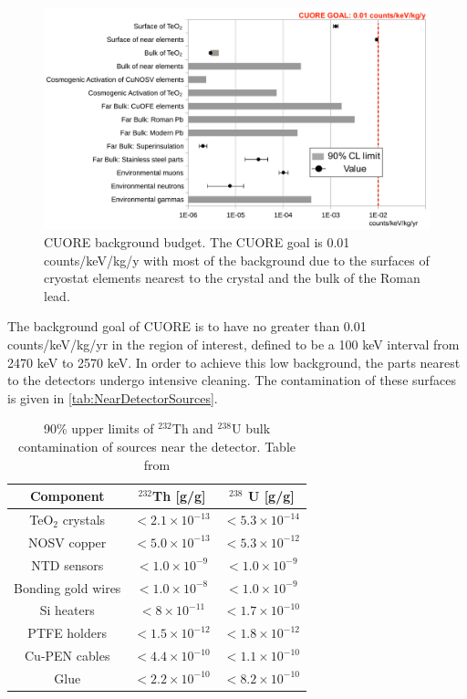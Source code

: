 \begin{figure}[htbp]
\centering
\includegraphics[width=0.7\linewidth]{Figures/CUORE_background_budget}
\caption{CUORE background budget. The CUORE goal is 0.01 counts/keV/kg/y with most of the background due to the surfaces of cryostat elements nearest to the crystal and the bulk of the Roman lead.}
\label{fig:istogramma}
\end{figure}

The background goal of CUORE is to have no greater than 0.01 counts/keV/kg/yr in the region of interest, defined to be a 100 keV interval from 2470 keV to 2570 keV. In order to achieve this low background, the parts nearest to the detectors undergo intensive cleaning. The contamination of these surfaces is given in \autoref*{tab:NearDetectorSources}.

\begin{table}[htbp]
\centering
\caption[90\% upper limits of $^{232}$Th and $^{238}$U bulk contamination of sources near the detector.]{90\% upper limits of $^{232}$Th and $^{238}$U bulk contamination of sources near the detector. Table from \cite{Alduino:2016vjd}}
\label{tab:NearDetectorSources}
\begin{tabular}{|c|c|c|}
\hline 
 Component & $^{232}$Th [g/g] & $^{238}$ U [g/g] \\ 
\hline 
TeO$_2$ crystals & $< 2.1\times 10^{-13}$ & $<5.3\times 10^{-14}$ \\ 
\hline 
NOSV copper & $<5.0 \times 10^{-13}$ & $<5.3 \times 10^{-12}$ \\ 
\hline 
NTD sensors & $< 1.0 \times 10^{-9}$ & $<1.0 \times 10^{-9}$ \\ 
\hline 
Bonding gold wires & $< 1.0 \times 10^{-8}$ & $<1.0 \times 10^{-9}$ \\ 
\hline 
Si heaters &   $<8\times 10^{-11}$ & $<1.7 \times 10^{-10}$ \\ 
\hline 
PTFE holders & $<1.5\times 10^{-12}$ & $<1.8 \times 10^{-12}$ \\ 
\hline 
Cu-PEN cables & $<4.4\times 10^{-10}$ & $<1.1 \times 10^{-10}$ \\ 
\hline
Glue & $<2.2\times 10^{-10}$ & $<8.2\times10^{-10}$ \\
\hline 
\end{tabular} 
\end{table}



